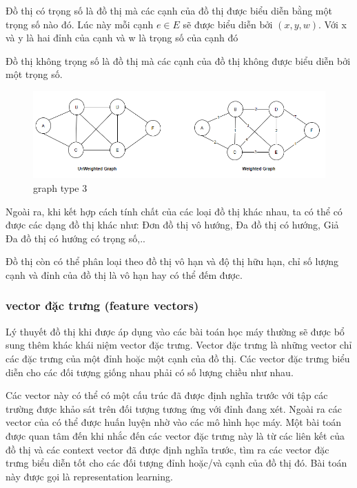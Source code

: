 Đồ thị có trọng số là đồ thị mà các cạnh của đồ thị được biểu diễn bằng một trọng số nào đó. Lúc này mỗi cạnh $e \in E$ sẽ được biểu diễn bởi $(x, y, w)$. Với x và y là hai đỉnh của cạnh và w là trọng số của cạnh đó

Đồ thị không trọng số là đồ thị mà các cạnh của đồ thị không được biểu diễn bởi một trọng số.

\begin{figure}[H]
    \begin{center}
        \includegraphics[scale=0.5]{images/graph-type-3}
        \caption{graph type 3}
        \label{fig:graph-type-3}
    \end{center}
\end{figure}


Ngoài ra, khi kết hợp cách tính chất của các loại đồ thị khác nhau, ta có thể có được các dạng đồ thị khác như: Đơn đồ thị vô hướng, Đa đồ thị có hướng, Giả Đa đồ thị có hướng có trọng số,..

Đồ thị còn có thể phân loại theo đồ thị vô hạn và độ thị hữu hạn, chỉ số lượng cạnh và đỉnh của đồ thị là vô hạn hay có thể đếm được.

\subsubsection{vector đặc trưng (feature vectors)}

Lý thuyết đồ thị khi được áp dụng vào các bài toán học máy thường sẽ được bổ sung thêm khác khái niệm vector đặc trưng. Vector đặc trưng là những vector chỉ các đặc trưng của một đỉnh hoặc một cạnh của đồ thị. Các vector đặc trưng biểu diễn cho các đối tượng giống nhau phải có số lượng chiều như nhau.

Các vector này có thể có một cấu trúc đã được định nghĩa trước với tập các trường được khảo sát trên đối tượng tương ứng với đỉnh đang xét. Ngoài ra các vector của có thể được huấn luyện nhờ vào các mô hình học máy. Một bài toán được quan tâm đến khi nhắc đến các vector đặc trưng này là từ các liên kết của đồ thị và các context vector đã được định nghĩa trước, tìm ra các vector đặc trưng biểu diễn tốt cho các đối tượng đỉnh hoặc/và cạnh của đồ thị đó. Bài toán này được gọi là representation learning.

